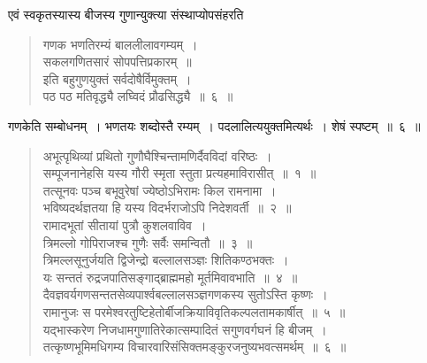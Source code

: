 \documentclass[11pt, openany]{book}
\begin{document}
\newpage
\pagestyle{fancy}
एवं स्वकृतस्यास्य बीजस्य गुणान्युक्त्या संस्थाप्योपसंहरति\textendash
\begin{quote}
    \ab 
      गणक भणतिरम्यं बाललीलावगम्यम्~।\\
 सकलगणितसारं सोपपत्तिप्रकारम्~॥~\\
 इति बहुगुणयुक्तं सर्वदोषैर्विमुक्तम्~।\\
 पठ पठ मतिवृद्ध्यै लघ्विदं प्रौढसिद्ध्यै~॥~६~॥~

\end{quote}

 गणकेति सम्बोधनम्~। भणतयः शब्दोस्तै रम्यम्~। पदलालित्ययुक्तमित्यर्थः~।
शेषं स्पष्टम्~॥~६~॥~
\begin{quote}
    \qt 
     अभूत्पृथिव्यां प्रथितो गुणौघैश्चिन्तामणिर्दैवविदां वरिष्ठः~।\\
 सम्पूजनानेहसि यस्य गौरी स्मृता स्तुता प्रत्यहमाविरासीत्~॥~१~॥~\\

\vspace{-5mm}
 तत्सूनवः पञ्च बभूवुरेषां ज्येष्ठोऽभिरामः किल रामनामा~।\\
 भविष्यदर्थज्ञतया हि यस्य विदर्भराजोऽपि निदेशवर्ती~॥~२~॥~\\

\vspace{-5mm}
 रामादभूतां सीतायां पुत्रौ कुशलवाविव~।\\
 त्रिमल्लो गोपिराजश्च गुणैः सर्वैः समन्वितौ~॥~३~॥~\\

\vspace{-5mm}
 त्रिमल्लसूनुर्जयति द्विजेन्द्रो बल्लालसञ्ज्ञः शितिकण्ठभक्तः~।\\
 यः सन्ततं रुद्रजपातिसङ्गाद्ब्राह्ममहो मूर्तमिवावभाति~॥~४~॥~\\

\vspace{-5mm}
 दैवज्ञवर्यगणसन्ततसेव्यपार्श्वबल्लालसञ्ज्ञगणकस्य सुतोऽस्ति कृष्णः~।\\
 रामानुजः स परमेश्वरतुष्टिहेतोर्बीजक्रियाविवृतिकल्पलतामकार्षीत्~॥~५~॥\\

\vspace{-5mm}
 यद्भास्करेण निजधामगुणातिरेकात्सम्पादितं सगुणवर्गघनं हि बीजम्~।\\
 तत्कृष्णभूमिमधिगम्य विचारवारिसंसिक्तमङ्कुरजनुष्यभवत्समर्थम्~॥~६~॥~

\end{quote}


\newpage
\end{document}
